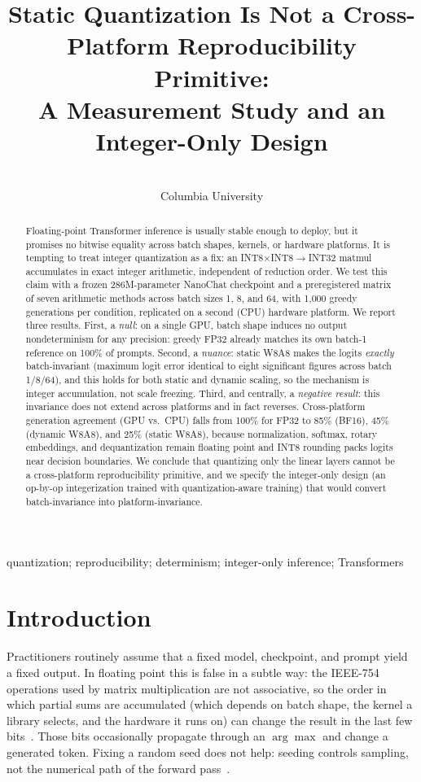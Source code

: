 \documentclass[wcp]{jmlr}
\title[Static Quantization Is Not a Cross-Platform Reproducibility Primitive]%
{Static Quantization Is Not a Cross-Platform Reproducibility Primitive:\\
A Measurement Study and an Integer-Only Design}
\author{\Name{James Burrell} \Email{jjb2271@columbia.edu}\\
\addr Columbia University}
\begin{document}
\maketitle

\begin{abstract}
Floating-point Transformer inference is usually stable enough to deploy, but it
promises no bitwise equality across batch shapes, kernels, or hardware platforms.
It is tempting to treat integer quantization as a fix: an INT8$\times$INT8$\to$INT32
matmul accumulates in exact integer arithmetic, independent of reduction order.
We test this claim with a frozen 286M-parameter NanoChat checkpoint and a
preregistered matrix of seven arithmetic methods across batch sizes 1, 8, and 64,
with 1{,}000 greedy generations per condition, replicated on a second (CPU)
hardware platform. We report three results. First, a \emph{null}: on a single GPU,
batch shape induces no output nondeterminism for any precision: greedy FP32
already matches its own batch-1 reference on 100\% of prompts. Second, a
\emph{nuance}: static W8A8 makes the logits \emph{exactly} batch-invariant (maximum
logit error identical to eight significant figures across batch 1/8/64), and this
holds for both static and dynamic scaling, so the mechanism is integer
accumulation, not scale freezing. Third, and centrally, a \emph{negative result}:
this invariance does not extend across platforms and in fact reverses. Cross-platform
generation agreement (GPU vs.\ CPU) falls from 100\% for FP32 to 85\% (BF16), 45\%
(dynamic W8A8), and 25\% (static W8A8), because normalization, softmax, rotary
embeddings, and dequantization remain floating point and INT8 rounding packs logits
near decision boundaries. We conclude that quantizing only the linear layers cannot
be a cross-platform reproducibility primitive, and we specify the integer-only
design (an op-by-op integerization trained with quantization-aware training) that
would convert batch-invariance into platform-invariance.
\end{abstract}

\begin{keywords}
quantization; reproducibility; determinism; integer-only inference; Transformers
\end{keywords}

\section{Introduction}
Practitioners routinely assume that a fixed model, checkpoint, and prompt yield a
fixed output. In floating point this is false in a subtle way: the IEEE-754
operations used by matrix multiplication are not associative, so the order in which
partial sums are accumulated (which depends on batch shape, the kernel a library
selects, and the hardware it runs on) can change the result in the last few
bits~\citep{pytorch_numerical}. Those bits occasionally propagate through an
$\arg\max$ and change a generated token. Fixing a random seed does not help:
seeding controls sampling, not the numerical path of the forward
pass~\citep{pytorch_reproducibility,he2025nondeterminism}.
\end{document}
